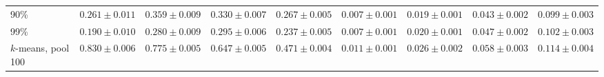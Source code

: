 \begin{table}[t]
{\begin{tabular}{l cccc cccc}
90\% & $0.261 \pm {\scriptstyle 0.011}$ & $0.359 \pm {\scriptstyle 0.009}$ & $0.330 \pm {\scriptstyle 0.007}$ & $0.267 \pm {\scriptstyle 0.005}$ & $0.007 \pm {\scriptstyle 0.001}$ & $0.019 \pm {\scriptstyle 0.001}$ & $0.043 \pm {\scriptstyle 0.002}$ & $0.099 \pm {\scriptstyle 0.003}$ \\
99\% & $0.190 \pm {\scriptstyle 0.010}$ & $0.280 \pm {\scriptstyle 0.009}$ & $0.295 \pm {\scriptstyle 0.006}$ & $0.237 \pm {\scriptstyle 0.005}$ & $0.007 \pm {\scriptstyle 0.001}$ & $0.020 \pm {\scriptstyle 0.001}$ & $0.047 \pm {\scriptstyle 0.002}$ & $0.102 \pm {\scriptstyle 0.003}$ \\
\midrule
$k$-means, pool 100 & $\bm{0.830} \pm {\scriptstyle 0.006}$ & $\bm{0.775} \pm {\scriptstyle 0.005}$ & $\bm{0.647} \pm {\scriptstyle 0.005}$ & $\bm{0.471} \pm {\scriptstyle 0.004}$ & $0.011 \pm {\scriptstyle 0.001}$ & $0.026 \pm {\scriptstyle 0.002}$ & $0.058 \pm {\scriptstyle 0.003}$ & $0.114 \pm {\scriptstyle 0.004}$ \\
\bottomrule
\end{tabular}
}
\end{table}
